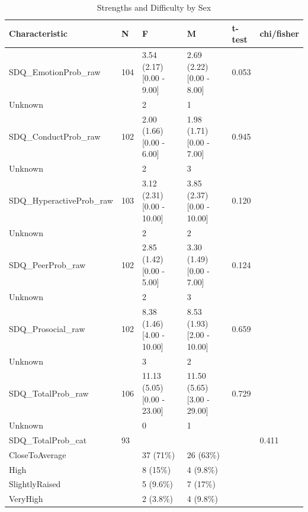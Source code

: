 \documentclass[
]{article}
\begin{document}
\begin{table}[!h]

\caption{\label{tab:SDQ_sex_tab}Strengths and Difficulty by Sex}
\centering
\begin{tabular}[t]{llllll}
\toprule
Characteristic & N & F & M & t-test & chi/fisher\\
\midrule
SDQ\_EmotionProb\_raw & 104 & 3.54 (2.17)   [0.00 - 9.00] & 2.69 (2.22)   [0.00 - 8.00] & 0.053 & \\
\hspace{1em}Unknown &  & 2 & 1 &  \vphantom{1} & \\
SDQ\_ConductProb\_raw & 102 & 2.00 (1.66)   [0.00 - 6.00] & 1.98 (1.71)   [0.00 - 7.00] & 0.945 & \\
\hspace{1em}Unknown &  & 2 & 3 &  \vphantom{3} & \\
SDQ\_HyperactiveProb\_raw & 103 & 3.12 (2.31)   [0.00 - 10.00] & 3.85 (2.37)   [0.00 - 10.00] & 0.120 & \\
\addlinespace
\hspace{1em}Unknown &  & 2 & 2 &  \vphantom{1} & \\
SDQ\_PeerProb\_raw & 102 & 2.85 (1.42)   [0.00 - 5.00] & 3.30 (1.49)   [0.00 - 7.00] & 0.124 & \\
\hspace{1em}Unknown &  & 2 & 3 &  \vphantom{2} & \\
SDQ\_Prosocial\_raw & 102 & 8.38 (1.46)   [4.00 - 10.00] & 8.53 (1.93)   [2.00 - 10.00] & 0.659 & \\
\hspace{1em}Unknown &  & 3 & 2 &  \vphantom{1} & \\
\addlinespace
SDQ\_TotalProb\_raw & 106 & 11.13 (5.05)   [0.00 - 23.00] & 11.50 (5.65)   [3.00 - 29.00] & 0.729 & \\
\hspace{1em}Unknown &  & 0 & 1 &  & \\
SDQ\_TotalProb\_cat & 93 &  &  &  & 0.411\\
\hspace{1em}CloseToAverage &  & 37 (71\%) & 26 (63\%) &  & \\
\hspace{1em}High &  & 8 (15\%) & 4 (9.8\%) &  & \\
\addlinespace
\hspace{1em}SlightlyRaised &  & 5 (9.6\%) & 7 (17\%) &  & \\
\hspace{1em}VeryHigh &  & 2 (3.8\%) & 4 (9.8\%) &  & \\

\end{tabular}
\end{table}
\end{document}
